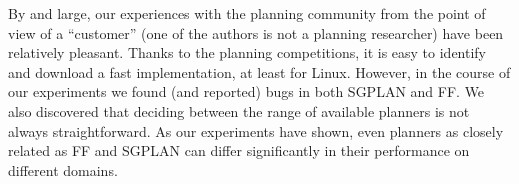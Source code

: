 By and large, our experiences with the planning community from the point of
view of a ``customer'' (one of the authors is not a planning researcher)
have been relatively pleasant. Thanks to the planning competitions, it is
easy to identify and download a fast implementation, at least for Linux.
However, in the course of our experiments we found (and reported) bugs in
both SGPLAN and FF. We also discovered that deciding between the range of
available planners is not always straightforward. As our experiments have
shown, even planners as closely related as FF and SGPLAN can differ
significantly in their performance on different domains.




